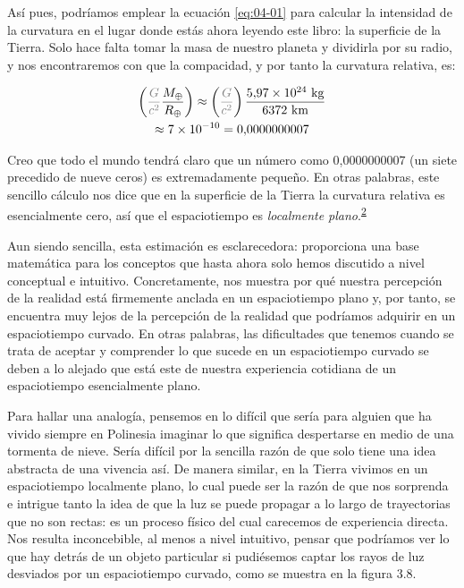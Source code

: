 Así pues, podríamos emplear la ecuación \eqref{eq:04-01} para calcular la intensidad
de la curvatura en el lugar donde estás ahora leyendo este libro: la superficie de
la Tierra. Solo hace falta tomar la masa de nuestro planeta y dividirla por su
radio, y nos encontraremos con que la compacidad, y por
tanto la curvatura relativa, es:

\begin{equation}\label{eq:04-02}
\begin{gathered}
\left(\textcolor{gray}{\frac{G}{c^{2}}}\frac{M_{\oplus}}{R_{\oplus}}\right)
\approx \left(\textcolor{gray}{\frac{G}{c^{2}}}\right)\frac{5{,}97\times 10^{24}\ \mathrm{kg}}{6372\ \mathrm{km}} \\
\approx 7\times 10^{-10}=0{,}0000000007
\end{gathered}
\end{equation}


Creo que todo el mundo tendrá claro que un número como 0,0000000007 (un siete
precedido de nueve ceros) es extremadamente pequeño. En otras palabras, este
sencillo cálculo nos dice que en la superficie de la Tierra la curvatura relativa es
esencialmente cero, así que el espaciotiempo es \emph{localmente
plano}.\textsuperscript{\hyperlink{note:04-02}{2}}

Aun siendo sencilla, esta estimación es esclarecedora: proporciona una base
matemática para los conceptos que hasta ahora solo hemos discutido a nivel
conceptual e intuitivo. Concretamente, nos muestra por qué nuestra
percepción de la realidad está firmemente anclada en un
espaciotiempo plano y, por tanto, se encuentra muy lejos de la percepción de la
realidad que podríamos adquirir en un espaciotiempo curvado. En otras palabras, las
dificultades que tenemos cuando se trata de aceptar y comprender lo que sucede en
un espaciotiempo curvado se deben a lo alejado que está este de nuestra experiencia
cotidiana de un espaciotiempo esencialmente plano.

Para hallar una analogía, pensemos en lo difícil que sería para alguien que ha
vivido siempre en Polinesia imaginar lo que significa despertarse en medio de una
tormenta de nieve. Sería difícil por la sencilla razón de que solo tiene una idea
abstracta de una vivencia así. De manera similar, en la Tierra vivimos en un
espaciotiempo localmente plano, lo cual puede ser
la razón de que nos sorprenda e intrigue tanto la idea de que la luz se puede
propagar a lo largo de trayectorias que no son rectas: es un proceso físico del
cual carecemos de experiencia directa. Nos resulta inconcebible, al menos a nivel
intuitivo, pensar que podríamos ver lo que hay detrás de un objeto particular si
pudiésemos captar los rayos de luz desviados por un espaciotiempo curvado, como se
muestra en la figura 3.8.

